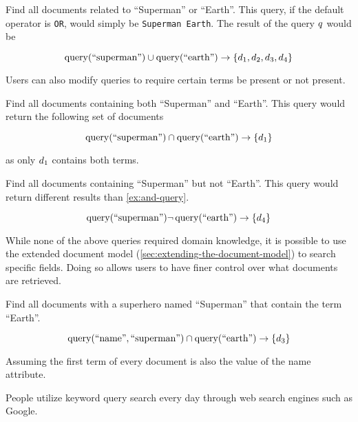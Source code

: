 		\begin{ex}
			Find all documents related to ``Superman'' or ``Earth''.  This query, if the default operator is \texttt{OR}, would simply be \texttt{Superman Earth}.	The result of the query \(q\) would be
			
			\[
				\operatorname{query}(\text{``superman''}) \cup \operatorname{query}(\text{``earth''}) \rightarrow \{d_1, d_2, d_3, d_4\}
			\]
		\end{ex}
		
		Users can also modify queries to require certain terms be present or not present.
		
		\begin{ex}
		\label{ex:and-query}
			Find all documents containing both ``Superman'' and ``Earth''.	This query would return the following set of documents
			
			\[
				\operatorname{query}(\text{``superman''}) \cap \operatorname{query}(\text{``earth''}) \rightarrow \{d_1\}
			\]
			
			as only \(d_1\) contains both terms.
		\end{ex}
		
		\begin{ex}
			Find all documents containing ``Superman'' but not ``Earth''.  This query would return different results than \vref{ex:and-query}.
			
			\[
				\operatorname{query}(\text{``superman''}) \neg\operatorname{query}(\text{``earth''}) \rightarrow \{d_4\}
			\]
		\end{ex}
		
		While none of the above queries required domain knowledge, it is possible to use the extended document model (\vref{sec:extending-the-document-model}) to search specific fields.  Doing so allows users to have finer control over what documents are retrieved.
		
		\begin{ex}
			Find all documents with a superhero named ``Superman'' that contain the term ``Earth''.
			
			\[
				\operatorname{query}(\text{``name''}, \text{``superman''}) \cap \operatorname{query}(\text{``earth''}) \rightarrow \{d_3\}
			\]
			
			Assuming the first term of every document is also the value of the name attribute.
		\end{ex}
		
		People utilize keyword query search every day through web search engines such as Google.
		
